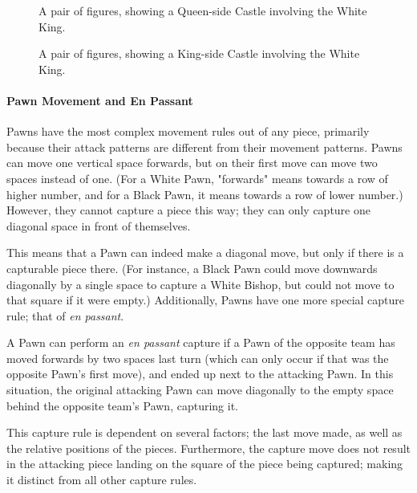 \begin{figure}[h]
    \centering
    \showboard
    \quad
    \showboard
    \label{queensidecastle}
    \caption{A pair of figures, showing a Queen-side Castle involving the White King.}
\end{figure}

\begin{figure}[h]
    \centering
    \showboard
    \quad
    \showboard
    \label{kingsidecastle}
    \caption{A pair of figures, showing a King-side Castle involving the White King.}
\end{figure}

\paragraph{Pawn Movement and En Passant} \label{passantsection}

Pawns have the most complex movement rules out of any piece, primarily because their attack patterns are different from their movement patterns. Pawns can move one vertical space forwards, but on their first move can move two spaces instead of one. (For a White Pawn, "forwards" means towards a row of higher number, and for a Black Pawn, it means towards a row of lower number.) However, they cannot capture a piece this way; they can only capture one diagonal space in front of themselves.


This means that a Pawn can indeed make a diagonal move, but only if there is a capturable piece there. (For instance, a Black Pawn could move downwards diagonally by a single space to capture a White Bishop, but could not move to that square if it were empty.) Additionally, Pawns have one more special capture rule; that of \emph{en passant}.

A Pawn can perform an \emph{en passant} capture if a Pawn of the opposite team has moved forwards by two spaces last turn (which can only occur if that was the opposite Pawn's first move), and ended up next to the attacking Pawn. In this situation, the original attacking Pawn can move diagonally to the empty space behind the opposite team's Pawn, capturing it.


This capture rule is dependent on several factors; the last move made, as well as the relative positions of the pieces. Furthermore, the capture move does not result in the attacking piece landing on the square of the piece being captured; making it distinct from all other capture rules.


